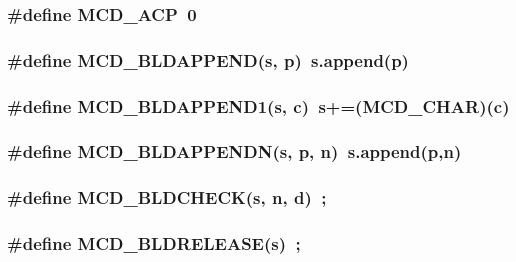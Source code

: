 \subsubsection[MCD\_\-ACP]{\setlength{\rightskip}{0pt plus 5cm}\#define MCD\_\-ACP~0}\label{Markup_8h_4b7b55ce45b2dc0166e17835c36d24ae}


\subsubsection[MCD\_\-BLDAPPEND]{\setlength{\rightskip}{0pt plus 5cm}\#define MCD\_\-BLDAPPEND(s, \/  p)~s.append(p)}\label{Markup_8h_1b5b2dbff24ec07b7f947a92c79374db}


\subsubsection[MCD\_\-BLDAPPEND1]{\setlength{\rightskip}{0pt plus 5cm}\#define MCD\_\-BLDAPPEND1(s, \/  c)~s+=(MCD\_\-CHAR)(c)}\label{Markup_8h_66fdcace6236f2f212b819bbb607eb00}


\subsubsection[MCD\_\-BLDAPPENDN]{\setlength{\rightskip}{0pt plus 5cm}\#define MCD\_\-BLDAPPENDN(s, \/  p, \/  n)~s.append(p,n)}\label{Markup_8h_3fa052a44a1028c32ec80a98e2dc2ee2}


\subsubsection[MCD\_\-BLDCHECK]{\setlength{\rightskip}{0pt plus 5cm}\#define MCD\_\-BLDCHECK(s, \/  n, \/  d)~;}\label{Markup_8h_462dda37bd35bcc7de74c6f137678994}


\subsubsection[MCD\_\-BLDRELEASE]{\setlength{\rightskip}{0pt plus 5cm}\#define MCD\_\-BLDRELEASE(s)~;}\label{Markup_8h_9ed9b064f852a4ad5a9727b72f09c761}


